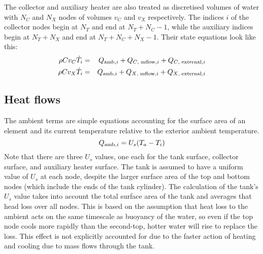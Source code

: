 The collector and auxiliary heater are also treated as discretised volumes of water with $N_C$ and $N_X$ nodes of volumes $v_C$ and $v_X$ respectively.
The indices $i$ of the collector nodes begin at $N_T$ and end at $N_T+N_C-1$, while the auxiliary indices begin at $N_T+N_X$ and end at $N_T+N_C+N_X-1$.
Their state equations look like this:
\begin{eqnarray}
   \label{eq:coll-node-dT}
   \rho C v_C \dot{T}_i &=& Q_{\text{amb}, i} + Q_{\text{$C$, mflow}, i} + Q_{\text{$C$, external}, i}
	\\
   \label{eq:aux-node-dT}
   \rho C v_X \dot{T}_i &=& Q_{\text{amb}, i} + Q_{\text{$X$, mflow}, i} + Q_{\text{$X$, external}, i}
\end{eqnarray}

\subsection{Heat flows}

The ambient terms are simple equations accounting for the surface area of an element and its current temperature relative to the exterior ambient temperature.
\begin{equation}
   \label{eq:Q-amb}
   Q_{\text{amb}, i} = U_s (T_a - T_i)
\end{equation}
Note that there are three $U_s$ values, one each for the tank surface, collector surface, and auxiliary heater surface.
The tank is assumed to have a uniform value of $U_s$ at each node, despite the larger surface area of the top and bottom nodes (which include the ends of the tank cylinder).
The calculation of the tank's $U_s$ value takes into account the total surface area of the tank and averages that head loss over all nodes.
This is based on the assumption that heat loss to the ambient acts on the same timescale as buoyancy of the water, so even if the top node cools more rapidly than the second-top, hotter water will rise to replace the loss.
This effect is not explicitly accounted for due to the faster action of heating and cooling due to mass flows through the tank.


